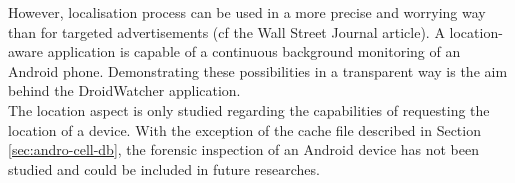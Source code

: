 However, localisation process can be used in a more precise and worrying way than for targeted advertisements (cf the Wall Street Journal article).
A location-aware application is capable of a continuous background monitoring of an Android phone.
Demonstrating these possibilities in a transparent way is the aim behind the DroidWatcher application.\\

The location aspect is only studied regarding the capabilities of requesting the location of a device.
With the exception of the cache file described in Section \ref{sec:andro-cell-db}, the forensic inspection of an Android device has not been studied and could be included in future researches.




